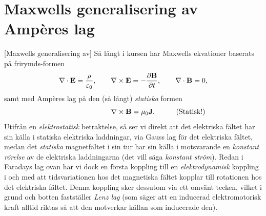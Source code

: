 {{{{{\section{Maxwells generalisering av Amp{\`e}res lag}
[Maxwells generalisering av]
S{\aa} l{\aa}ngt i kursen
har Maxwells ekvationer baserats p{\aa} frirymds-formen
$$
  \nabla\cdot{\bf E}={{\rho}\over{\varepsilon_0}},\qquad
  \nabla\times{\bf E}=-{{\partial{\bf B}}\over{\partial t}},\qquad
  \nabla\cdot{\bf B}=0,
$$
samt med Amp{\`e}res lag p{\aa} den (s{\aa} l{\aa}ngt) {\it statiska} formen
$$
  \hskip70pt\nabla\times{\bf B}=\mu_0{\bf J}.\hskip30pt(\hbox{Statisk!})
$$
Utifr{\aa}n en {\it elektrostatisk} betraktelse, s{\aa} ser vi direkt att det
elektriska f{\"a}ltet har sin k{\"a}lla i statiska elektriska laddningar, via
Gauss lag f{\"o}r det elektriska f{\"a}ltet, medan det {\it statiska}
magnetf{\"a}ltet i sin tur har sin k{\"a}lla i motsvarande en  {\it konstant
r{\"o}relse} av de elektriska laddningarna (det vill s{\"a}ga {\it konstant
str{\"o}m}).
Redan i Faradays lag ovan har vi dock en f{\"o}rsta koppling till en
{\it elektrodynamisk} koppling i och med att tidsvariationen hos det magnetiska
f{\"a}ltet kopplar till rotationen hos det elektriska f{\"a}ltet.
Denna koppling sker dessutom via ett omv{\"a}nt tecken, vilket i grund och
botten fastst{\"a}ller {\it Lenz lag} (som s{\"a}ger att en inducerad
elektromotorisk kraft alltid riktas s{\aa} att den motverkar k{\"a}llan som
inducerade den).

}}}}}
